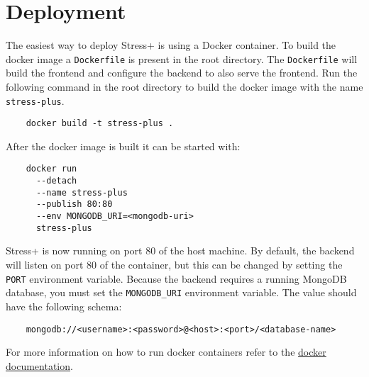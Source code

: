 \section{Deployment}
\label{sec:deployment}

The easiest way to deploy Stress+ is using a Docker container.
To build the docker image a \texttt{Dockerfile} is present in the root directory. 
The \texttt{Dockerfile} will build the frontend and configure the backend to also serve the frontend. 
Run the following command in the root directory to build the docker image with the name \texttt{stress-plus}.
\begin{verbatim}
    docker build -t stress-plus .
\end{verbatim}
After the docker image is built it can be started with:
\begin{verbatim}
    docker run 
      --detach 
      --name stress-plus 
      --publish 80:80 
      --env MONGODB_URI=<mongodb-uri> 
      stress-plus
\end{verbatim}
Stress+ is now running on port $80$ of the host machine.
By default, the backend will listen on port $80$ of the container, but this can be changed by setting the \texttt{PORT} environment variable.
Because the backend requires a running MongoDB database, you must set the \texttt{MONGODB\_URI} environment variable. 
The value should have the following schema:
\begin{verbatim}
    mongodb://<username>:<password>@<host>:<port>/<database-name>
\end{verbatim}

For more information on how to run docker containers refer to the \href{https://docs.docker.com/engine/reference/commandline/run}{docker documentation}.
